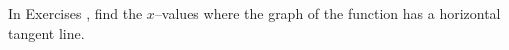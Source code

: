 {\noindent In Exercises}
{, find the $x$--values where the graph of the function has a horizontal tangent line.
}
